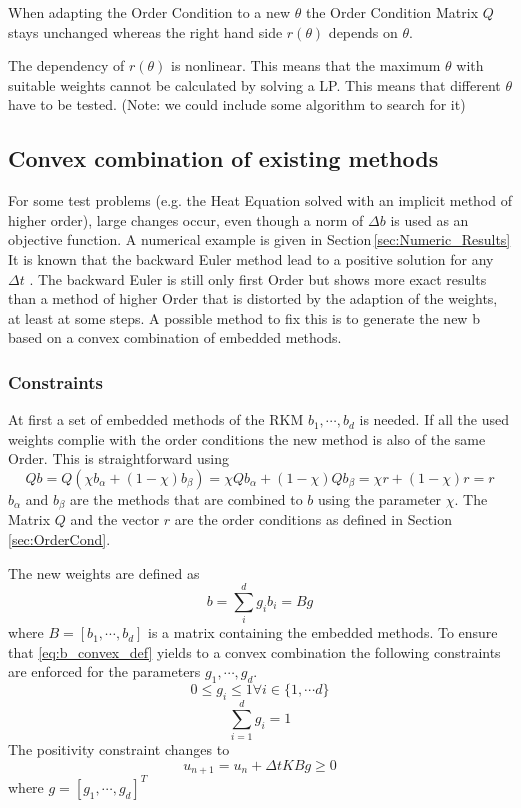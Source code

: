 \documentclass[a4paper]{scrartcl}
\numberwithin{equation}{section}
\theoremstyle{plain}
\theoremstyle{definition}
\numberwithin{theorem}{section}
\newcommand{\dt}{{\Delta t}}
\newcommand{\1}{\mathbbm{1}}
\begin{document}
When adapting the Order Condition to a new $\theta$ the Order Condition Matrix $Q$ stays unchanged whereas the right hand side $r(\theta)$ depends on $\theta$.

The dependency of $r(\theta)$ is nonlinear. This means that the maximum $\theta$ with suitable weights cannot be calculated by solving a LP. This means that different $\theta$ have to be tested. 
(Note: we could include some algorithm to search for it)

\subsection{Convex combination of existing methods}\label{sec:convex}
For some test problems (e.g. the Heat Equation solved with an implicit method of higher order), large changes occur, even though a norm of $\Delta b$ is used as an objective function. A numerical example is given in Section\,\ref{sec:Numeric_Results}
It is known that the backward Euler method lead to a positive solution for any $\dt$ \cite{hundsdorfer_numerical_2003}. The backward Euler is still only first Order but shows more exact results than a method of higher Order that is distorted by the adaption of the weights, at least at some steps. 
A possible method to fix this is to generate the new b based on a convex combination of embedded methods. 

\subsubsection{Constraints}
At first a set of embedded methods of the RKM $b_1,\cdots,b_d$ is needed. 
If all the used weights complie with the order conditions the new method is also of the same Order.
This is straightforward using
$$ Q b = Q (\chi b_{\alpha} + (1-\chi) b_{\beta}) = \chi Q  b_{\alpha} + (1-\chi) Q b_{\beta} = \chi r + (1-\chi) r = r$$
$b_{\alpha}$ and $b_{\beta}$ are the methods that are combined to $b$ using the parameter $\chi$. The Matrix $Q$ and the vector $r$ are the order conditions as defined in Section\,\ref{sec:OrderCond}.

The new weights are defined as 
\begin{equation}\label{eq:b_convex_def}
b = \sum_i^d g_i b_i = Bg
\end{equation}
where $B=\left[b_1,\cdots,b_d \right]$ is a matrix containing the embedded methods.  
To ensure that \eqref{eq:b_convex_def} yields to a convex combination the following constraints are enforced for the parameters $g_1,\cdots,g_d$.
\begin{equation}
 0 \leq g_i \leq 1  \forall {i \in \{1, \cdots d \}}
\end{equation}
\begin{equation}
 \sum_{i=1}^d g_i = 1
\end{equation}
The positivity constraint changes to 
$$u_{n+1}=u_n+\dt K B g \geq 0$$
where $g = [g_1,\cdots,g_d]^T$
\end{document}
